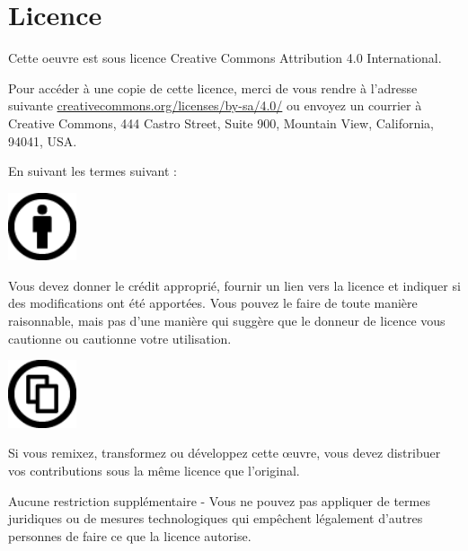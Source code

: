 \chapter{Licence}
	Cette oeuvre est sous licence Creative Commons Attribution 4.0 International.

	Pour accéder à une copie de cette licence, merci de vous rendre à l'adresse suivante \href{https://creativecommons.org/licenses/by-sa/4.0/}{creativecommons.org/licenses/by-sa/4.0/} ou envoyez un courrier à Creative Commons, 444 Castro Street, Suite 900, Mountain View, California, 94041, USA.

	En suivant les termes suivant :

	\begin{minipage}{0.2\textwidth}
		\includegraphics[height=2cm]{res/imgs/by}
	\end{minipage}
	\begin{minipage}{0.8\textwidth}
		Vous devez donner le crédit approprié, fournir un lien vers la licence et indiquer si des modifications ont été apportées. Vous pouvez le faire de toute manière raisonnable, mais pas d'une manière qui suggère que le donneur de licence vous cautionne ou cautionne votre utilisation.
	\end{minipage}

	\begin{minipage}{0.2\textwidth}
		\includegraphics[height=2cm]{res/imgs/share}
	\end{minipage}
	\begin{minipage}{0.8\textwidth}
		Si vous remixez, transformez ou développez cette œuvre, vous devez distribuer vos contributions sous la même licence que l'original.
	\end{minipage}

	Aucune restriction supplémentaire - Vous ne pouvez pas appliquer de termes juridiques ou de mesures technologiques qui empêchent légalement d'autres personnes de faire ce que la licence autorise.